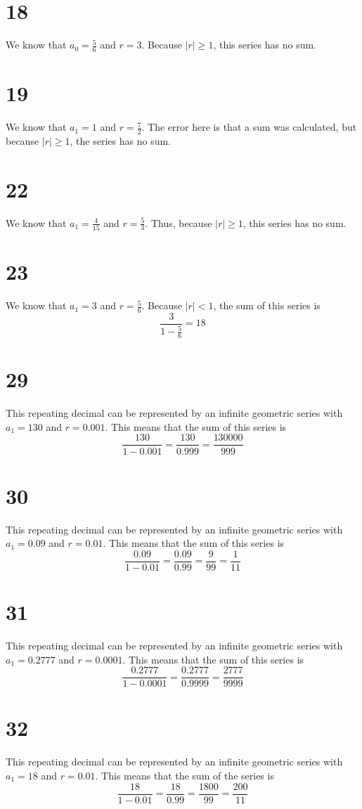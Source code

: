 \documentclass{article}
\theoremstyle{definition}
\newcommand{\?}{\stackrel{?}{=}}
\begin{document}
\section*{18}
We know that $a_0=\frac{5}{6}$ and $r=3$. Because $|r|\ge 1$, this series has no sum.

\section*{19}
We know that $a_1=1$ and $r=\frac{7}{2}$. The error here is that a sum was calculated, but because $|r|\ge 1$, the series has no sum.

\section*{22}
We know that $a_1=\frac{4}{15}$ and $r=\frac{5}{3}$. Thus, because $|r|\ge 1$, this series has no sum.

\section*{23}
We know that $a_1=3$ and $r=\frac{5}{6}$. Because $|r|<1$, the sum of this series is
\[ \frac{3}{1-\frac{5}{6}}=18 \]

\section*{29}
This repeating decimal can be represented by an infinite geometric series with $a_1=130$ and $r=0.001$. This means that the sum of this series is
\[ \frac{130}{1-0.001}=\frac{130}{0.999}=\frac{130000}{999} \]

\section*{30}
This repeating decimal can be represented by an infinite geometric series with $a_1=0.09$ and $r=0.01$. This means that the sum of this series is
\[ \frac{0.09}{1-0.01}=\frac{0.09}{0.99}=\frac{9}{99}=\frac{1}{11} \]

\section*{31}
This repeating decimal can be represented by an infinite geometric series with $a_1=0.2777$ and $r=0.0001$. This means that the sum of this series is
\[ \frac{0.2777}{1-0.0001}=\frac{0.2777}{0.9999}=\frac{2777}{9999} \]

\section*{32}
This repeating decimal can be represented by an infinite geometric series with $a_1=18$ and $r=0.01$. This means that the sum of the series is
\[ \frac{18}{1-0.01}=\frac{18}{0.99}=\frac{1800}{99}=\frac{200}{11} \]
\end{document}
